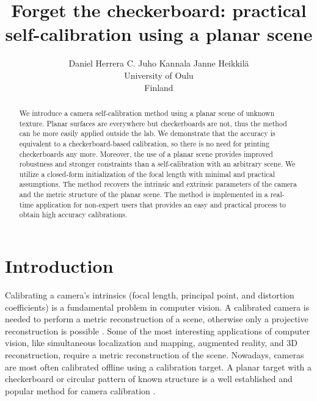 \documentclass[10pt,twocolumn,letterpaper]{article}
\begin{document}
\title{Forget the checkerboard: practical self-calibration using a planar scene}

\author{Daniel Herrera C. \qquad Juho Kannala \qquad Janne Heikkil\"a\\
University of Oulu\\
Finland\\
}

\maketitle


\begin{abstract}
We introduce a camera self-calibration method using a planar scene of unknown texture. Planar surfaces are everywhere but checkerboards are not, thus the method can be more easily applied outside the lab. We demonstrate that the accuracy is equivalent to a checkerboard-based calibration, so there is no need for printing checkerboards any more. Moreover, the use of a planar scene provides improved robustness and stronger constraints than a self-calibration with an arbitrary scene. We utilize a closed-form initialization of the focal length with minimal and practical assumptions. The method recovers the intrinsic and extrinsic parameters of the camera and the metric structure of the planar scene. The method is implemented in a real-time application for non-expert users that provides an easy and practical process to obtain high accuracy calibrations. 
\end{abstract}

\section{Introduction}

Calibrating a camera's intrinsics (focal length, principal point, and distortion coefficients) is a fundamental problem in computer vision. A calibrated camera is needed to perform a metric reconstruction of a scene, otherwise only a projective reconstruction is possible \cite{hartley2003}. Some of the most interesting applications of computer vision, like simultaneous localization and mapping, augmented reality, and 3D reconstruction, require a metric reconstruction of the scene. Nowadays, cameras are most often calibrated offline using a calibration target. A planar target with a checkerboard or circular pattern of known structure is a well established and popular method for camera calibration \cite{sturm1999,zhang1999,bouguetMCT,kannala2008}.
\end{document}
